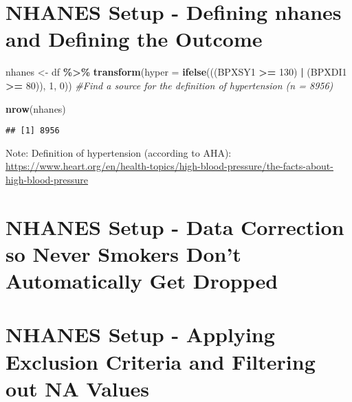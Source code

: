 \documentclass[
]{article}
\newenvironment{Shaded}{\begin{snugshade}}{\end{snugshade}}
\newcommand{\AttributeTok}[1]{\textcolor[rgb]{0.13,0.29,0.53}{#1}}
\newcommand{\CommentTok}[1]{\textcolor[rgb]{0.56,0.35,0.01}{\textit{#1}}}
\newcommand{\DecValTok}[1]{\textcolor[rgb]{0.00,0.00,0.81}{#1}}
\newcommand{\FunctionTok}[1]{\textcolor[rgb]{0.13,0.29,0.53}{\textbf{#1}}}
\newcommand{\NormalTok}[1]{#1}
\newcommand{\OtherTok}[1]{\textcolor[rgb]{0.56,0.35,0.01}{#1}}
\newcommand{\SpecialCharTok}[1]{\textcolor[rgb]{0.81,0.36,0.00}{\textbf{#1}}}
\begin{document}
\section{NHANES Setup - Defining nhanes and Defining the
Outcome}\label{nhanes-setup---defining-nhanes-and-defining-the-outcome}

\begin{Shaded}
\begin{Highlighting}[]
\NormalTok{nhanes }\OtherTok{\textless{}{-}}\NormalTok{ df }\SpecialCharTok{\%\textgreater{}\%}  
  \FunctionTok{transform}\NormalTok{(}\AttributeTok{hyper =} \FunctionTok{ifelse}\NormalTok{(((BPXSY1 }\SpecialCharTok{\textgreater{}=} \DecValTok{130}\NormalTok{) }\SpecialCharTok{|}\NormalTok{ (BPXDI1 }\SpecialCharTok{\textgreater{}=} \DecValTok{80}\NormalTok{)), }\DecValTok{1}\NormalTok{, }\DecValTok{0}\NormalTok{)) }\CommentTok{\#Find a source for the definition of hypertension (n = 8956)}

\FunctionTok{nrow}\NormalTok{(nhanes)}
\end{Highlighting}
\end{Shaded}

\begin{verbatim}
## [1] 8956
\end{verbatim}

Note: Definition of hypertension (according to AHA):
\url{https://www.heart.org/en/health-topics/high-blood-pressure/the-facts-about-high-blood-pressure}

\section{NHANES Setup - Data Correction so Never Smokers Don't
Automatically Get
Dropped}\label{nhanes-setup---data-correction-so-never-smokers-dont-automatically-get-dropped}

\begin{Shaded}
\end{Shaded}

\section{NHANES Setup - Applying Exclusion Criteria and Filtering out NA
Values}\label{nhanes-setup---applying-exclusion-criteria-and-filtering-out-na-values}
\end{document}
